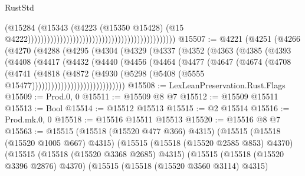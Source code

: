 \begin{lexlean}{RustStd}
\begin{coremodule}
                                                                                        (@15284
                                                                                          (@15343
                                                                                            (@4223
                                                                                              (@15350
                                                                                                @15428)
                                                                                              (@15
                                                                                                @4222))))))))))))))))))))))))))))))))))))))))))))))
@15507 := @4221
    (@4251
      (@4266
        (@4270
          (@4288
            (@4295
              (@4304
                (@4329
                  (@4337
                    (@4352
                      (@4363
                        (@4385
                          (@4393
                            (@4408
                              (@4417
                                (@4432
                                  (@4440
                                    (@4456
                                      (@4464
                                        (@4477
                                          (@4647
                                            (@4674
                                              (@4708
                                                (@4741
                                                  (@4818
                                                    (@4872
                                                      (@4930
                                                        (@5298
                                                          (@5408
                                                            (@5555
                                                              @15477)))))))))))))))))))))))))))))
@15508 := LexLeanPreservation.Rust.Flags
@15509 := Prod.{0, 0}
@15511 := @15509 @8 @7
@15512 := @15509 @15511
@15513 := Bool
@15514 := @15512 @15513
@15515 := @2 @15514
@15516 := Prod.mk.{0, 0}
@15518 := @15516 @15511 @15513
@15520 := @15516 @8 @7
@15563 := @15515
    (@15518 (@15520 @477 @366) @4315)
    (@15515
      (@15518 (@15520 @1005 @667) @4315)
      (@15515
        (@15518 (@15520 @2585 @853) @4370)
        (@15515
          (@15518 (@15520 @3368 @2685) @4315)
          (@15515
            (@15518 (@15520 @3396 @2876) @4370)
            (@15515
              (@15518 (@15520 @3560 @3114) @4315)

\end{coremodule}
\end{lexlean}
